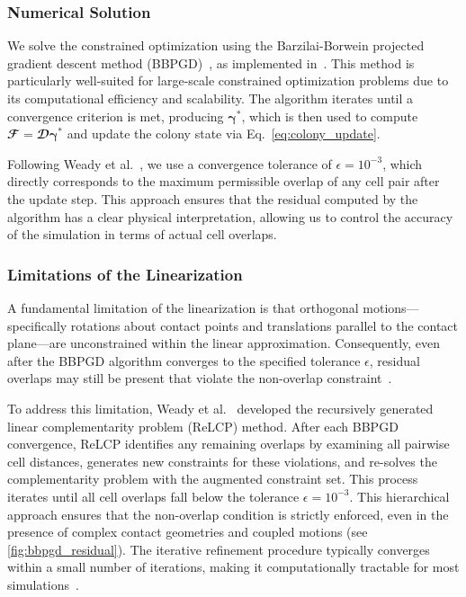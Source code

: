 \documentclass[conference]{IEEEtran}
\begin{document}
\subsubsection{Numerical Solution}

We solve the constrained optimization using the Barzilai-Borwein projected gradient descent method (BBPGD)~\cite{BBPGD}, as implemented in~\cite{Weady2024SM,Yan2019}. This method is particularly well-suited for large-scale constrained optimization problems due to its computational efficiency and scalability. The algorithm iterates until a convergence criterion is met, producing $\boldsymbol{\gamma}^*$, which is then used to compute $\mathbfcal{F} = \mathbfcal{D}\boldsymbol{\gamma}^*$ and update the colony state via Eq.~\ref{eq:colony_update}.

Following Weady et al.~\cite{Weady2024SM}, we use a convergence tolerance of $\epsilon = 10^{-3}$, which directly corresponds to the maximum permissible overlap of any cell pair after the update step. This approach ensures that the residual computed by the algorithm has a clear physical interpretation, allowing us to control the accuracy of the simulation in terms of actual cell overlaps.

\subsubsection{Limitations of the Linearization}

A fundamental limitation of the linearization is that orthogonal motions—specifically rotations about contact points and translations parallel to the contact plane—are unconstrained within the linear approximation. Consequently, even after the BBPGD algorithm converges to the specified tolerance $\epsilon$, residual overlaps may still be present that violate the non-overlap constraint~\cite{Weady2024SM}.

To address this limitation, Weady et al.~\cite{Weady2024SM} developed the recursively generated linear complementarity problem (ReLCP) method. After each BBPGD convergence, ReLCP identifies any remaining overlaps by examining all pairwise cell distances, generates new constraints for these violations, and re-solves the complementarity problem with the augmented constraint set. This process iterates until all cell overlaps fall below the tolerance $\epsilon = 10^{-3}$. This hierarchical approach ensures that the non-overlap condition is strictly enforced, even in the presence of complex contact geometries and coupled motions (see \autoref{fig:bbpgd_residual}). The iterative refinement procedure typically converges within a small number of iterations, making it computationally tractable for most simulations~\cite{Weady2024SM}.
\end{document}
